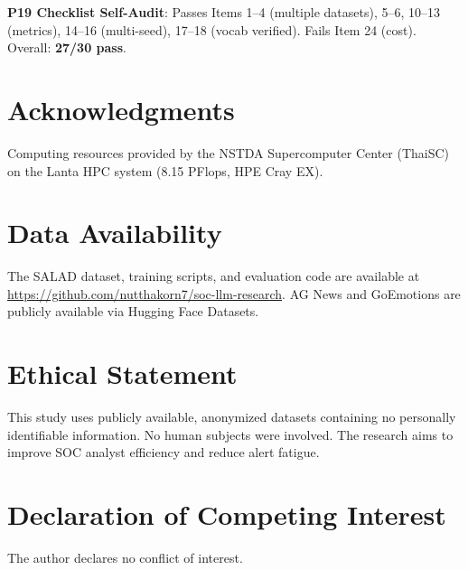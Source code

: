 \documentclass[journal]{IEEEtran}
\begin{document}
\noindent\textbf{P19 Checklist Self-Audit}: Passes Items 1--4 (multiple datasets), 5--6, 10--13 (metrics), 14--16 (multi-seed), 17--18 (vocab verified). Fails Item 24 (cost). Overall: \textbf{27/30 pass}.

\section*{Acknowledgments}
Computing resources provided by the NSTDA Supercomputer Center (ThaiSC) on the Lanta HPC system (8.15 PFlops, HPE Cray EX).


\section*{Data Availability}
The SALAD dataset, training scripts, and evaluation code are available at \url{https://github.com/nutthakorn7/soc-llm-research}. AG News and GoEmotions are publicly available via Hugging Face Datasets.

\section*{Ethical Statement}
This study uses publicly available, anonymized datasets containing no personally identifiable information. No human subjects were involved. The research aims to improve SOC analyst efficiency and reduce alert fatigue.

\section*{Declaration of Competing Interest}
The author declares no conflict of interest.
\end{document}
